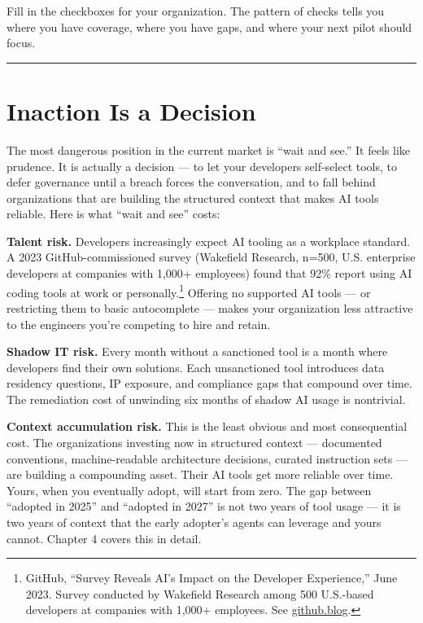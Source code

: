 \documentclass[
  a4paper,
  DIV=11,
  numbers=noendperiod]{scrreprt}
\begin{document}
Fill in the checkboxes for your organization. The pattern of checks
tells you where you have coverage, where you have gaps, and where your
next pilot should focus.

\begin{center}\rule{0.5\linewidth}{0.5pt}\end{center}

\section{Inaction Is a Decision}\label{inaction-is-a-decision}

The most dangerous position in the current market is ``wait and see.''
It feels like prudence. It is actually a decision --- to let your
developers self-select tools, to defer governance until a breach forces
the conversation, and to fall behind organizations that are building the
structured context that makes AI tools reliable. Here is what ``wait and
see'' costs:

\textbf{Talent risk.} Developers increasingly expect AI tooling as a
workplace standard. A 2023 GitHub-commissioned survey (Wakefield
Research, n=500, U.S. enterprise developers at companies with 1,000+
employees) found that 92\% report using AI coding tools at work or
personally.\footnote{GitHub, ``Survey Reveals AI's Impact on the
  Developer Experience,'' June 2023. Survey conducted by Wakefield
  Research among 500 U.S.-based developers at companies with 1,000+
  employees. See
  \href{https://github.blog/news-insights/research/survey-reveals-ais-impact-on-the-developer-experience/}{github.blog}.}
Offering no supported AI tools --- or restricting them to basic
autocomplete --- makes your organization less attractive to the
engineers you're competing to hire and retain.

\textbf{Shadow IT risk.} Every month without a sanctioned tool is a
month where developers find their own solutions. Each unsanctioned tool
introduces data residency questions, IP exposure, and compliance gaps
that compound over time. The remediation cost of unwinding six months of
shadow AI usage is nontrivial.

\textbf{Context accumulation risk.} This is the least obvious and most
consequential cost. The organizations investing now in structured
context --- documented conventions, machine-readable architecture
decisions, curated instruction sets --- are building a compounding
asset. Their AI tools get more reliable over time. Yours, when you
eventually adopt, will start from zero. The gap between ``adopted in
2025'' and ``adopted in 2027'' is not two years of tool usage --- it is
two years of context that the early adopter's agents can leverage and
yours cannot. Chapter 4 covers this in detail.
\end{document}
